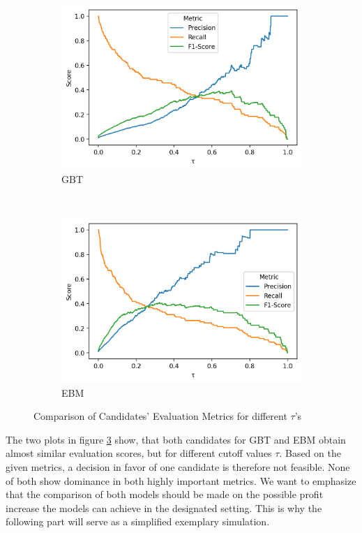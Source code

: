 \documentclass[12pt,titlepage]{article}
\begin{document}
\begin{figure}[H]
    \centering
    \begin{subfigure}{.70\textwidth}
      \includegraphics[width=1\linewidth]{gbt_prec_rec_plot.png}
      \caption{GBT}
      \label{fig:gbt_prec_rec_plot}
    \end{subfigure} \\
    \begin{subfigure}{.70\textwidth}
      \includegraphics[width=1\linewidth]{ebm_prec_rec_plot.png}
      \caption{EBM}
      \label{fig:ebm_prec_rec_plot}
    \end{subfigure}
    \caption{Comparison of Candidates' Evaluation Metrics for different $\tau$'s}
\label{fig:prec_rec_plot}
\end{figure}
\noindent
The two plots in figure \ref{fig:prec_rec_plot} show, that both candidates for GBT and EBM obtain almost similar evaluation scores, but for different cutoff values $\tau$. Based on the given metrics, a decision in favor of one candidate is therefore not feasible. None of both show dominance in both highly important metrics. We want to emphasize that the comparison of both models should be made on the possible profit increase the models can achieve in the designated setting. This is why the following part will serve as a simplified exemplary simulation. \\
\end{document}
